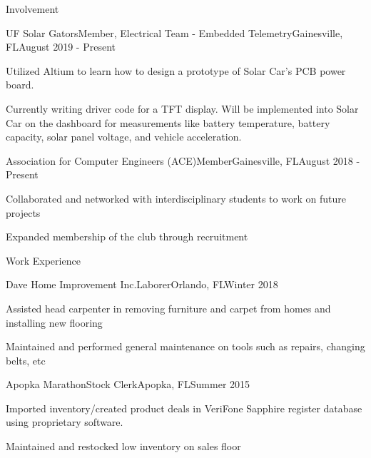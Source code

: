 \documentclass{article}
\newlength{\tabin}
\newlength{\secsep}
\newcommand{\lineunder}{\vspace*{-8pt} \\ \hspace*{-6pt} \hrulefill \\ \vspace*{-15pt}}
\newenvironment{tabbedsection}[1]{
  \begin{list}{}{
      \setlength{\itemsep}{0pt}
      \setlength{\labelsep}{0pt}
      \setlength{\labelwidth}{0pt}
      \setlength{\leftmargin}{\tabin}
      \setlength{\rightmargin}{\tabin}
      \setlength{\listparindent}{0pt}
      \setlength{\parsep}{0pt}
      \setlength{\parskip}{0pt}
      \setlength{\partopsep}{0pt}
      \setlength{\topsep}{#1}
    }
  \item[]
}{\end{list}}
\newenvironment{resume_section}[1]{ 
  \filbreak
  \vspace{2\secsep}
  \MakeUppercase{ \large#1}
  \lineunder
  \begin{tabbedsection}{\secsep}
}{\end{tabbedsection}}
\newenvironment{subitems}{
  \renewcommand{\labelitemi}{-}
  \begin{itemize}
      \setlength{\labelsep}{1em}
}{\end{itemize}}
\newenvironment{resume_employer}[4]{
  \vspace{\secsep}
  \textbf{#1} \\ 
  \indent {\small #2} \hfill {\footnotesize#3 (#4)}
  \begin{tabbedsection}{0pt}
  \begin{subitems}
}{\end{subitems}\end{tabbedsection}}
\begin{document}
\begin{resume_section}{Involvement}
  \begin{resume_employer}{UF Solar Gators}{Member, Electrical Team - Embedded Telemetry}{Gainesville, FL}{August 2019 - Present}
    \item Utilized Altium to learn how to design a prototype of Solar Car's PCB power board.
    \item Currently writing driver code for a TFT display. Will be implemented into Solar Car on the dashboard for measurements like battery temperature, battery capacity, solar panel voltage, and vehicle acceleration.
  \end{resume_employer}
  
  \begin{resume_employer}{Association for Computer Engineers (ACE)}{Member}{Gainesville, FL}{August 2018 - Present}
    \item Collaborated and networked with interdisciplinary students to work on future projects
    \item Expanded membership of the club through recruitment
  \end{resume_employer}

\end{resume_section}
 
\begin{resume_section}{Work Experience}
  \begin{resume_employer}{Dave Home Improvement  Inc.}{Laborer}{Orlando, FL}{Winter 2018}
    \item Assisted head carpenter in removing furniture and carpet from homes and installing new flooring
    \item Maintained and performed general maintenance on tools such as repairs, changing belts, etc
  \end{resume_employer}
  
  \begin{resume_employer}{Apopka Marathon}{Stock Clerk}{Apopka, FL}{Summer 2015}
    \item Imported inventory/created product deals in VeriFone Sapphire register database using proprietary software.
    \item Maintained and restocked low inventory on sales floor
  \end{resume_employer}
\end{resume_section}
\end{document}
